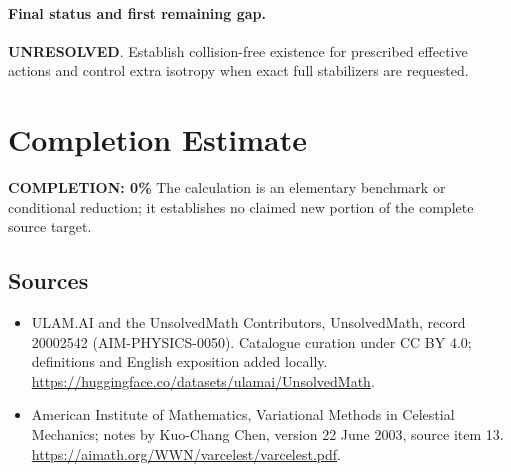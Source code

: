 \documentclass[11pt]{article}
\begin{document}
\paragraph{Final status and first remaining gap.}
\textbf{UNRESOLVED}. Establish collision-free existence for prescribed effective actions and control extra isotropy when exact full stabilizers are requested.

\section{Completion Estimate}
\noindent\textbf{COMPLETION: 0\%}
The calculation is an elementary benchmark or conditional reduction; it establishes no claimed new portion of the complete source target.

\subsection{Sources}
\begin{itemize}
\item[\hypertarget{source:20002542:1}{S1}] ULAM.AI and the UnsolvedMath Contributors, UnsolvedMath, record 20002542 (AIM-PHYSICS-0050). Catalogue curation under CC BY 4.0; definitions and English exposition added locally.
\url{https://huggingface.co/datasets/ulamai/UnsolvedMath}.
\item[\hypertarget{source:20002542:2}{S2}] American Institute of Mathematics, Variational Methods in Celestial Mechanics; notes by Kuo-Chang Chen, version 22 June 2003, source item 13.
\url{https://aimath.org/WWN/varcelest/varcelest.pdf}.
\end{itemize}
\label{end:20002542}
\end{document}
